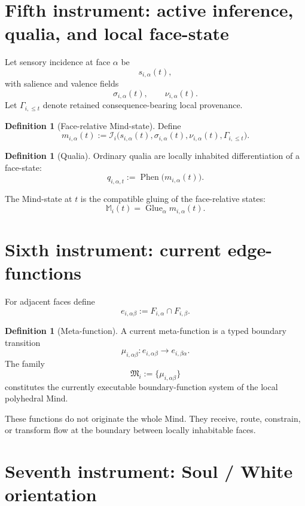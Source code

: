 \documentclass[10pt]{article}
\theoremstyle{pe}
\theoremstyle{definition}
\newtheorem{definition}[theorem]{Definition}
\newcommand{\Glue}{\operatorname{Glue}}
\newcommand{\Phen}{\operatorname{Phen}}
\begin{document}
\section{Fifth instrument: active inference, qualia, and local face-state}

Let sensory incidence at face \(\alpha\) be
\[
  s_{i,\alpha}(t),
\]
with salience and valence fields
\[
  \sigma_{i,\alpha}(t),
  \qquad
  \nu_{i,\alpha}(t).
\]
Let \(\Gamma_{i,\le t}\) denote retained consequence-bearing local provenance.

\begin{definition}[Face-relative Mind-state]
Define
\begin{equation}\label{eq:face-state}
  m_{i,\alpha}(t)
  :=
  \mathcal I_i
  \bigl(
    s_{i,\alpha}(t),
    \sigma_{i,\alpha}(t),
    \nu_{i,\alpha}(t),
    \Gamma_{i,\le t}
  \bigr).
\end{equation}
\end{definition}

\begin{definition}[Qualia]
Ordinary qualia are locally inhabited differentiation of a face-state:
\[
  q_{i,\alpha,t}
  :=
  \Phen\bigl(m_{i,\alpha}(t)\bigr).
\]
\end{definition}

The Mind-state at \(t\) is the compatible gluing of the face-relative states:
\[
  \boxed{
  \mathbb M_i(t)
  =
  \Glue_{\alpha}m_{i,\alpha}(t).
  }
\]

\section{Sixth instrument: current edge-functions}

For adjacent faces define
\[
  e_{i,\alpha\beta}
  :=
  F_{i,\alpha}\cap F_{i,\beta}.
\]

\begin{definition}[Meta-function]
A current meta-function is a typed boundary transition
\[
  \mu_{i,\alpha\beta}:
  e_{i,\alpha\beta}
  \longrightarrow
  e_{i,\beta\alpha}.
\]
The family
\[
  \mathfrak M_i
  :=
  \{\mu_{i,\alpha\beta}\}
\]
constitutes the currently executable boundary-function system of the local polyhedral Mind.
\end{definition}

These functions do not originate the whole Mind.  They receive, route, constrain, or transform flow at the boundary between locally inhabitable faces.

\section{Seventh instrument: Soul / White orientation}
\end{document}
